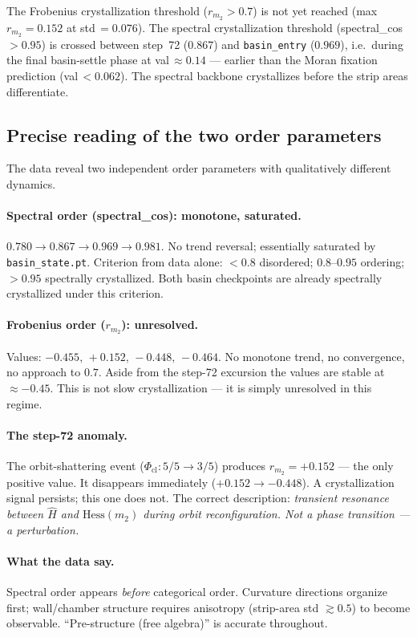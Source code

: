 \documentclass[11pt]{amsart}
\begin{document}
The Frobenius crystallization threshold ($r_{m_2} > 0.7$)
is not yet reached (max $r_{m_2} = 0.152$ at std\,$= 0.076$).
The spectral crystallization threshold (spectral\_cos $> 0.95$)
is crossed between step~72 ($0.867$) and \texttt{basin\_entry} ($0.969$),
i.e.\ during the final basin-settle phase at val\,$\approx 0.14$ ---
earlier than the Moran fixation prediction (val\,$< 0.062$).
The spectral backbone crystallizes before the strip areas differentiate.


\subsection*{Precise reading of the two order parameters}

The data reveal two independent order parameters with qualitatively
different dynamics.

\paragraph{Spectral order (spectral\_cos): monotone, saturated.}
$0.780 \to 0.867 \to 0.969 \to 0.981$.
No trend reversal; essentially saturated by \texttt{basin\_state.pt}.
Criterion from data alone: $<0.8$ disordered; $0.8$--$0.95$ ordering;
$>0.95$ spectrally crystallized.
Both basin checkpoints are already spectrally crystallized under
this criterion.

\paragraph{Frobenius order ($r_{m_2}$): unresolved.}
Values: $-0.455,\, +0.152,\, -0.448,\, -0.464$.
No monotone trend, no convergence, no approach to $0.7$.
Aside from the step-72 excursion the values are stable at $\approx -0.45$.
This is not slow crystallization --- it is simply unresolved in
this regime.

\paragraph{The step-72 anomaly.}
The orbit-shattering event ($\Phi_\mathrm{cl}: 5/5 \to 3/5$)
produces $r_{m_2} = +0.152$ --- the only positive value.
It disappears immediately ($+0.152 \to -0.448$).
A crystallization signal persists; this one does not.
The correct description: \emph{transient resonance between $\hat{H}$
and $\mathrm{Hess}(m_2)$ during orbit reconfiguration.
Not a phase transition --- a perturbation.}

\paragraph{What the data say.}
Spectral order appears \emph{before} categorical order.
Curvature directions organize first; wall/chamber structure
requires anisotropy (strip-area std $\gtrsim 0.5$) to become observable.
``Pre-structure (free algebra)'' is accurate throughout.
\end{document}
